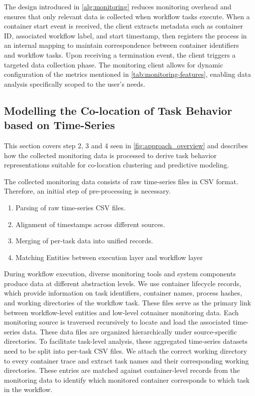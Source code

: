 The design introduced in \ref{alg:monitoring} reduces monitoring overhead and ensures that only relevant data is collected when workflow tasks execute. When a container start event is received, the client extracts metadata such as container ID, associated workflow label, and start timestamp, then registers the process in an internal mapping to maintain correspondence between container identifiers and workflow tasks. Upon receiving a termination event, the client triggers a targeted data collection phase. The monitoring client allows for dynamic configuration of the metrics mentioned in \ref{tab:monitoring-features}, enabling data analysis specifically scoped to the user's needs.

\subsection{Modelling the Co-location of Task Behavior based on Time-Series}
\label{sec:data_analysis}
This section covers step 2, 3 and 4 seen in \ref{fig:approach_overview} and describes how the collected monitoring data is processed to derive task behavior representations suitable for co-location clustering and predictive modeling.

\label{sec:data_preprocessing_general}

The collected monitoring data consists of raw time-series files in CSV format. Therefore, an initial step of pre-processing is necessary.

\begin{enumerate}
    \item Parsing of raw time-series CSV files.
    \item Alignment of timestamps across different sources.
    \item Merging of per-task data into unified records.
    \item Matching Entities between execution layer and workflow layer
\end{enumerate}

During workflow execution, diverse monitoring tools and system components produce data at different abstraction levels.
We use container lifecycle records, which provide information on task identifiers, container names, process hashes, and working directories of the workflow task. These files serve as the primary link between workflow-level entities and low-level cotnainer monitoring data. Each monitoring source is traversed recursively to locate and load the associated time-series data. These data files are organized hierarchically under source-specific directories. To facilitate task-level analysis, these aggregated time-series datasets need to be split into per-task CSV files.
We attach the correct working directory to every container trace and extract task names and their corresponding working directories. These entries are matched against container-level records from the monitoring data to identify which monitored container corresponds to which task in the workflow.

